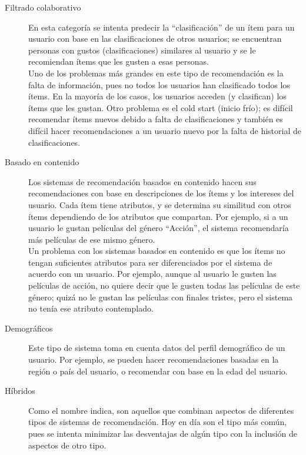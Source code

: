     \begin{description}
        \item[Filtrado colaborativo] En esta categoría se intenta predecir la “clasificación” de un ítem para un usuario con base en las 
        clasificaciones de otros usuarios; se encuentran personas con gustos (clasificaciones) similares al usuario y se le recomiendan 
        ítems que les gusten a esas personas.\\
        \newline
    Uno de los problemas más grandes en este tipo de recomendación es la falta de información, pues no todos los usuarios han 
    clasificado todos los ítems. En la mayoría de los casos, los usuarios acceden (y clasifican) los ítems que les gustan. Otro problema
    es el cold start (inicio frío); es difícil recomendar ítems nuevos debido a falta de clasificaciones y también es difícil hacer 
     recomendaciones a un usuario nuevo por la falta de historial de clasificaciones. \cite{mc1}
        \item[Basado en contenido] Los sistemas de recomendación basados en contenido hacen sus recomendaciones con base en descripciones de los 
    ítems y los intereses del usuario. Cada ítem tiene atributos, y se determina su similitud con otros ítems dependiendo de los 
    atributos que compartan. Por ejemplo, si a un usuario le gustan películas del género “Acción”, el sistema recomendaría más películas de ese mismo género.\\
    \newline
    Un problema con los sistemas basados en contenido es que los ítems no tengan suficientes atributos para ser diferenciados por el 
    sistema de acuerdo con un usuario. Por ejemplo, aunque al usuario le gusten las películas de acción, no quiere decir que le gusten 
    todas las películas de este género; quizá no le gustan las películas con finales tristes, pero el sistema no tenía ese atributo 
    contemplado. \cite{mc4}
    
    \item[Demográficos] Este tipo de sistema toma en cuenta datos del perfil demográfico de un usuario. Por ejemplo, se pueden hacer recomendaciones basadas en la región o país del usuario, o recomendar con base en la edad del usuario.\cite{mc5}
    \item[Híbridos] Como el nombre indica, son aquellos que combinan aspectos de diferentes tipos de sistemas de recomendación. Hoy en día son el tipo más común, pues se intenta minimizar las desventajas de algún tipo con la inclusión de aspectos de otro tipo.
    
    
    \end{description}
    
